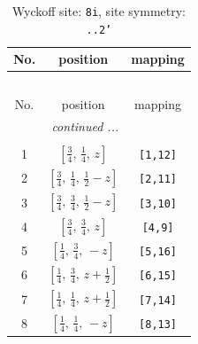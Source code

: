 \documentclass[fleqn,8pt]{jsarticle}
\begin{document}
\begin{longtable}{ccc}
\caption{Wyckoff site: {\tt 8i}, site symmetry: {\tt ..2'}}
 \\
 \hline \hline
No. & position & mapping \\ \hline \endfirsthead

\multicolumn{2}{l}{\tablename\ \thetable{}} \\
 \hline \hline
No. & position & mapping \\ \hline \endhead

 \hline \hline
\multicolumn{2}{r}{\footnotesize\it continued ...} \\ \endfoot

 \hline \hline
\multicolumn{2}{r}{} \\ \endlastfoot

1 & $\left[ \frac{3}{4},\, \frac{1}{4},\, z \right]$ & {\tt [1,12]} \\ \hline
2 & $\left[ \frac{3}{4},\, \frac{1}{4},\, \frac{1}{2} - z \right]$ & {\tt [2,11]} \\ \hline
3 & $\left[ \frac{3}{4},\, \frac{3}{4},\, \frac{1}{2} - z \right]$ & {\tt [3,10]} \\ \hline
4 & $\left[ \frac{3}{4},\, \frac{3}{4},\, z \right]$ & {\tt [4,9]} \\ \hline
5 & $\left[ \frac{1}{4},\, \frac{3}{4},\, - z \right]$ & {\tt [5,16]} \\ \hline
6 & $\left[ \frac{1}{4},\, \frac{3}{4},\, z + \frac{1}{2} \right]$ & {\tt [6,15]} \\ \hline
7 & $\left[ \frac{1}{4},\, \frac{1}{4},\, z + \frac{1}{2} \right]$ & {\tt [7,14]} \\ \hline
8 & $\left[ \frac{1}{4},\, \frac{1}{4},\, - z \right]$ & {\tt [8,13]} \\
\end{longtable}
\renewcommand{\arraystretch}{1.2}
\end{document}
